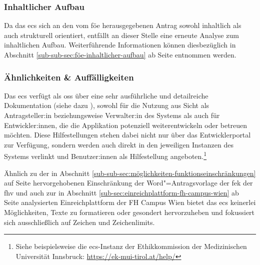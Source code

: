 \documentclass[a4paper,12pt,twoside,numbers=noendperiod]{scrreprt}
\begin{document}
\subsubsection*{Inhaltlicher Aufbau}
\label{sub-sub-sec:ecs-inhaltlicher-aufbau}

Da das \ac{ecs} sich an den vom \acl{föe} herausgegebenen Antrag sowohl inhaltlich als auch strukturell orientiert, entfällt an dieser Stelle eine erneute Analyse zum inhaltlichen Aufbau. Weiterführende Informationen können diesbezüglich in Abschnitt \ref{sub-sub-sec:föe-inhaltlicher-aufbau} ab Seite \pageref{sub-sub-sec:föe-inhaltlicher-aufbau} entnommen werden.

\subsubsection*{Ähnlichkeiten \& Auffälligkeiten}
\label{sub-sub-sec:ähnlichkeiten-auffälligkeiten-ecs}

Das \acl{ecs} verfügt als \ac{oss} über eine sehr ausführliche und detailreiche Dokumentation (siehe dazu \cite{medizinische_universitat_wien_ecs-docs_about-2021, medizinische_universitat_wien_development_2021, medizinische_universitat_wien_installationusage_2021, medizinische_universitat_wien_ecs-handbook_development-2021, ethics_commission_system_organization_ecs_2021}), sowohl für die Nutzung aus Sicht als Antragsteller:in beziehungsweise Verwalter:in des Systems als auch für Entwickler:innen, die die Applikation potenziell weiterentwickeln oder betreuen möchten. Diese Hilfestellungen stehen dabei nicht nur über das Entwicklerportal zur Verfügung, sondern werden auch direkt in den jeweiligen Instanzen des Systems verlinkt und Benutzer:innen als Hilfestellung angeboten.\footnote{Siehe beispielsweise die \ac{ecs}-Instanz der Ethikkommission der Medizinischen Universität Innsbruck: \url{https://ek-mui-tirol.at/help/}}

\medskip

Ähnlich zu der in Abschnitt \ref{sub-sub-sec:möglichkeiten-funktionseinschränkungen} auf Seite \pageref{sub-sub-sec:möglichkeiten-funktionseinschränkungen} hervorgehobenen Einschränkung der Word"=Antragsvorlage der \ac{fek} der \ac{fhv} und auch zur in Abschnitt \ref{sub-sec:einreichplattform-fh-campus-wien} ab Seite \pageref{sub-sec:einreichplattform-fh-campus-wien} analysierten Einreichplattform der FH Campus Wien bietet das \acl{ecs} keinerlei Möglichkeiten, Texte zu formatieren oder gesondert hervorzuheben und fokussiert sich ausschließlich auf Zeichen und Zeichenlimits.
\end{document}
